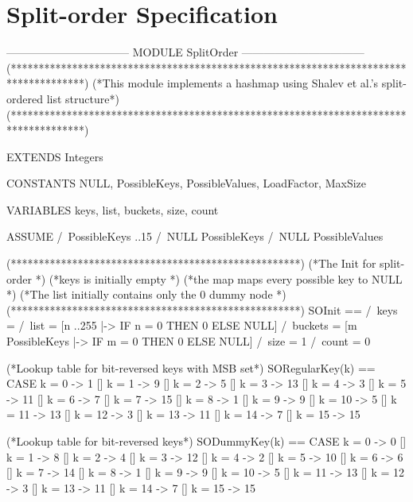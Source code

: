 \documentclass{uit-thesis}
\begin{document}
\backmatter
\printbibliography{}
\appendix
{}
\chapter{Split-order Specification}\label{appendix:specification}
    \begin{tla}
        --------------------------------- MODULE SplitOrder ---------------------------------
        (*************************************************************************************)
        (*This module implements a hashmap using Shalev et al.'s split-ordered list structure*)
        (*************************************************************************************)
        
        EXTENDS Integers
        
        CONSTANTS NULL, PossibleKeys, PossibleValues, LoadFactor, MaxSize
        
        VARIABLES keys, list, buckets, size, count
        
        ASSUME
        /\ PossibleKeys ..15
        /\ NULL \notin PossibleKeys
        /\ NULL \notin PossibleValues
        
        (****************************************************)
        (*The Init for split-order                          *)
        (*keys is initially empty                           *)
        (*the map maps every possible key to NULL           *)
        (*The list initially contains only the 0 dummy node *)
        (****************************************************)
SOInit ==   /\ keys = {}
/\ list = [n ..255 |-> IF n = 0 THEN 0 ELSE NULL]
/\ buckets = [m \in PossibleKeys |-> IF m = 0 THEN 0 ELSE NULL]
/\ size = 1
/\ count = 0

(*Lookup table for bit-reversed keys with MSB set*)
SORegularKey(k) ==  CASE k = 0 -> 1
[] k = 1 -> 9
[] k = 2 -> 5
[] k = 3 -> 13
[] k = 4 -> 3
[] k = 5 -> 11
[] k = 6 -> 7
[] k = 7 -> 15
[] k = 8 -> 1
[] k = 9 -> 9
[] k = 10 -> 5
[] k = 11 -> 13
[] k = 12 -> 3
[] k = 13 -> 11
[] k = 14 -> 7
[] k = 15 -> 15

(*Lookup table for bit-reversed keys*)
SODummyKey(k) ==    CASE k = 0 -> 0
[] k = 1 -> 8
[] k = 2 -> 4
[] k = 3 -> 12
[] k = 4 -> 2
[] k = 5 -> 10
[] k = 6 -> 6
[] k = 7 -> 14
[] k = 8 -> 1
[] k = 9 -> 9
[] k = 10 -> 5
[] k = 11 -> 13
[] k = 12 -> 3
[] k = 13 -> 11
[] k = 14 -> 7
                     [] k = 15 -> 15
                     

\end{tla}
\end{document}
